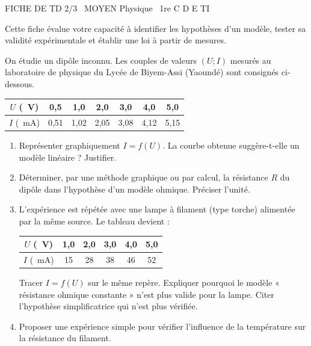 \documentclass[11pt]{article}
\begin{document}
\begin{tcolorbox}[enhanced,colback=popink,colframe=popink,arc=10pt,boxrule=0pt,left=12pt,right=12pt,top=9pt,bottom=9pt]
{\color{white}\popxbold\small FICHE DE TD 2/3 \textbullet\ MOYEN \hfill Physique \textbullet\ 1re C D E TI\par}
\end{tcolorbox}
\vspace{4pt}
Cette fiche évalue votre capacité à identifier les hypothèses d'un modèle, tester sa validité expérimentale et établir une loi à partir de mesures.

\begin{exercice}
On étudie un dipôle inconnu. Les couples de valeurs $(U ; I)$ mesurés au laboratoire de physique du Lycée de Biyem-Assi (Yaoundé) sont consignés ci-dessous.

\begin{center}
\begin{tabular}{|c|c|c|c|c|c|c|}
\hline
$U$ (\SI{}{V}) & 0,5 & 1,0 & 2,0 & 3,0 & 4,0 & 5,0 \\
\hline
$I$ (\SI{}{mA}) & 0,51 & 1,02 & 2,05 & 3,08 & 4,12 & 5,15 \\
\hline
\end{tabular}
\end{center}

\begin{enumerate}
    \item Représenter graphiquement $I = f(U)$. La courbe obtenue suggère-t-elle un modèle linéaire ? Justifier.
    \item Déterminer, par une méthode graphique ou par calcul, la résistance $R$ du dipôle dans l'hypothèse d'un modèle ohmique. Préciser l'unité.
    \item L'expérience est répétée avec une lampe à filament (type torche) alimentée par la même source. Le tableau devient :
    \begin{center}
    \begin{tabular}{|c|c|c|c|c|c|}
    \hline
    $U$ (\SI{}{V}) & 1,0 & 2,0 & 3,0 & 4,0 & 5,0 \\
    \hline
    $I$ (\SI{}{mA}) & 15 & 28 & 38 & 46 & 52 \\
    \hline
    \end{tabular}
    \end{center}
    Tracer $I = f(U)$ sur le même repère. Expliquer pourquoi le modèle « résistance ohmique constante » n'est plus valide pour la lampe. Citer l'hypothèse simplificatrice qui n'est plus vérifiée.
    \item Proposer une expérience simple pour vérifier l'influence de la température sur la résistance du filament.
\end{enumerate}
\end{exercice}
\end{document}
